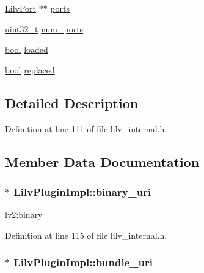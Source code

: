\begin{DoxyCompactItemize}
\hyperlink{lilv_8h_a772dad64b72690372c1f78314012bda5}{Lilv\+Port} $\ast$$\ast$ \hyperlink{struct_lilv_plugin_impl_ab047415ad765783ae57fbe31cdf9249e}{ports}
\item 
\hyperlink{lib-src_2ffmpeg_2win32_2stdint_8h_a6eb1e68cc391dd753bc8ce896dbb8315}{uint32\+\_\+t} \hyperlink{struct_lilv_plugin_impl_ac0b1c43adf9e1d65c27a9a603d62615e}{num\+\_\+ports}
\item 
\hyperlink{mac_2config_2i386_2lib-src_2libsoxr_2soxr-config_8h_abb452686968e48b67397da5f97445f5b}{bool} \hyperlink{struct_lilv_plugin_impl_a690daad491d8dc3d446fd4d796ef807e}{loaded}
\item 
\hyperlink{mac_2config_2i386_2lib-src_2libsoxr_2soxr-config_8h_abb452686968e48b67397da5f97445f5b}{bool} \hyperlink{struct_lilv_plugin_impl_aa1c8afaa2542c54f9dfd821d118fe7d4}{replaced}
\end{DoxyCompactItemize}


\subsection{Detailed Description}


Definition at line 111 of file lilv\+\_\+internal.\+h.



\subsection{Member Data Documentation}
\subsubsection[{\texorpdfstring{binary\+\_\+uri}{binary_uri}}]{$\ast$ Lilv\+Plugin\+Impl\+::binary\+\_\+uri}\hypertarget{struct_lilv_plugin_impl_a0fb4f626dd8a102784b312cf5f5acbb4}{}\label{struct_lilv_plugin_impl_a0fb4f626dd8a102784b312cf5f5acbb4}


lv2\+:binary 



Definition at line 115 of file lilv\+\_\+internal.\+h.

\subsubsection[{\texorpdfstring{bundle\+\_\+uri}{bundle_uri}}]{$\ast$ Lilv\+Plugin\+Impl\+::bundle\+\_\+uri}\hypertarget{struct_lilv_plugin_impl_af4f6c03ce7414bd8697e4f2291f15c37}{}\label{struct_lilv_plugin_impl_af4f6c03ce7414bd8697e4f2291f15c37}



